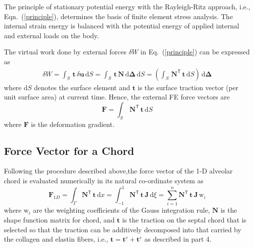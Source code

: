 
The principle of stationary potential energy with the Rayleigh-Ritz approach, i.e., Eqn.~(\ref{principle}), determines the basis of finite element stress analysis. The internal strain energy is balanced with the potential energy of applied internal and external loads on the body.

The virtual work done by external forces $\delta{W}$ in Eq.~(\ref{principle}) can be expressed as
\begin{equation}
\begin{aligned}
\delta{W} = \int_{S} \, \mathbf{t} \, \delta \mathbf{u} \, \mathrm{d} S
= \int_{S} \, \mathbf{t} \, \mathbf{N} \, \mathrm{d} \boldsymbol{\Delta} \, \mathrm{d} S
= \left( \int_{S} \, \mathbf{N}^{\mathsf{T}} \, \mathbf{t} \, \mathrm{d} S \right) \, \mathrm{d} \boldsymbol{\Delta}
\end{aligned}
\end{equation}
where $\mathrm{d} S$ denotes the surface element and $\mathbf{t}$ is the surface traction vector (per unit surface area) at current time. Hence, the external FE force vectors are
\begin{equation}
\mathbf{F} = \int_{S} \, \mathbf{N}^{\mathsf{T}} \, \mathbf{t} \, \mathrm{d} S 
\end{equation}
where $ \mathbf{F} $ is the deformation gradient.


\subsection{Force Vector for a Chord}

Following the procedure described above,the force vector of the 1-D alveolar chord is evaluated numerically in its natural co-ordinate system as
\begin{equation}
\mathbf{F}_{1D} = \int_{\Gamma} \mathbf{N}^{\mathsf{T}} \, \mathbf{t} \, \mathrm{d} x  = \int_{-1}^{1} \mathbf{N}^{\mathsf{T}}\, \mathbf{t} \, \mathbf{J}\,  \mathrm{d} \xi =  \sum_{i=1}^{n} \mathbf{N}^{\mathsf{T}} \, \mathbf{t} \, \mathbf{J} \, \mathrm{w}_i
\end{equation}
where $\mathrm{w}_i$ are the  weighting coefficients of the Gauss integration rule, $\mathbf{N}$ is the shape function matrix for chord, and $\mathbf{t}$ is the traction on the septal chord that is selected so that the traction can be additively decomposed into that carried by the collagen and elastin fibers, i.e., $\mathbf{t} = \mathbf{t}^c + \mathbf{t}^e $ as described in part 4.

